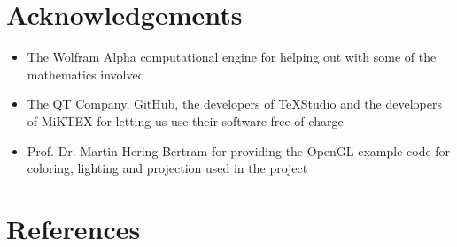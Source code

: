\documentclass[12pt,a4paper]{scrartcl}
\begin{document}
\section{Acknowledgements}
\begin{itemize}
	\item The Wolfram Alpha computational engine for helping out with some of the mathematics involved
	\item The QT Company, GitHub, the developers of TeXStudio and the developers of MiKTEX for letting us use their software free of charge
	\item Prof. Dr. Martin Hering-Bertram for providing the OpenGL example code for coloring, lighting and projection used in the project
\end{itemize}

\section{References}

\printbibliography[title=Sources,nottype=misc]
\printbibliography[title=Pictures,type=misc]
\end{document}
